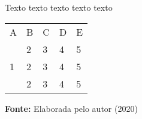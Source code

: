 \begin{quadro}
\caption{Texto texto texto texto texto}
\label{quad:exemplo_de_quadro}
\centering
\begin{tabular}{|lllll|}
\cline{1-5}
A& B &  C& D &E  \\ \cline{1-5}
\multirow{3}{*}{1}  & 2 &  3& 4& 5 \\
 &  2 &  3& 4& 5  \\
 &  2 &  3& 4& 5 \\
 \cline{1-5}
\end{tabular}
  \par\medskip\ABNTEXfontereduzida\selectfont\textbf{Fonte:} Elaborada pelo autor (2020) \par\medskip
\end{quadro}